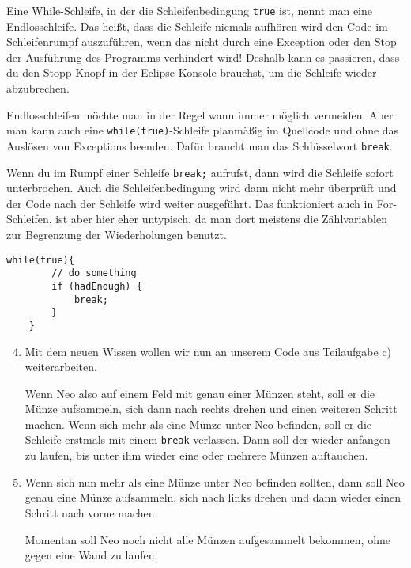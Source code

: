 \begin{Infobox}
	Eine While-Schleife, in der die Schleifenbedingung \lstinline{true} ist, nennt man eine Endlosschleife.
	Das heißt, dass die Schleife niemals aufhören wird den Code im Schleifenrumpf auszuführen, wenn das nicht durch eine Exception oder den Stop der Ausführung des Programms verhindert wird!
	Deshalb kann es passieren, dass du den Stopp Knopf in der Eclipse Konsole brauchst, um die Schleife wieder abzubrechen.\newline

	Endlosschleifen möchte man in der Regel wann immer möglich vermeiden.
	Aber man kann auch eine \lstinline{while(true)}-Schleife planmäßig im Quellcode und ohne das Auslösen von Exceptions beenden.
	Dafür braucht man das Schlüsselwort \lstinline{break}.\newline

	Wenn du im Rumpf einer Schleife \lstinline{break;} aufrufst, dann wird die Schleife sofort unterbrochen.
	Auch die Schleifenbedingung wird dann nicht mehr überprüft und der Code nach der Schleife wird weiter ausgeführt.
	Das funktioniert auch in For-Schleifen, ist aber hier eher untypisch, da man dort meistens die Zählvariablen zur Begrenzung der Wiederholungen benutzt.

	\begin{lstlisting}[numbers=none]
	while(true){
		// do something
		if (hadEnough) {
			break;
		}
	}
	\end{lstlisting}

\end{Infobox}


\begin{enumerate}\setcounter{enumi}{3}
	\item
		Mit dem neuen Wissen wollen wir nun an unserem Code aus Teilaufgabe c) weiterarbeiten.

		Wenn Neo also auf einem Feld mit genau einer Münzen steht, soll er die Münze aufsammeln, sich dann nach rechts drehen und einen weiteren Schritt machen.
		Wenn sich mehr als eine Münze unter Neo befinden, soll er die Schleife erstmals mit einem \lstinline{break} verlassen.
		Dann soll der wieder anfangen zu laufen, bis unter ihm wieder eine oder mehrere Münzen auftauchen.

	\item
		Wenn sich nun mehr als eine Münze unter Neo befinden sollten, dann soll Neo genau eine Münze aufsammeln, sich nach links drehen und dann wieder einen Schritt nach vorne machen.

		Momentan soll Neo noch nicht alle Münzen aufgesammelt bekommen, ohne gegen eine Wand zu laufen.
\end{enumerate}


